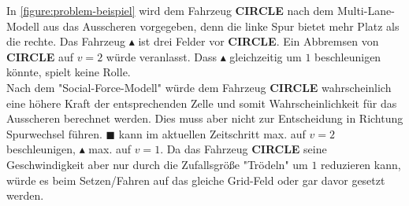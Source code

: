 In \ref{figure:problem-beispiel} wird dem Fahrzeug \textbf{CIRCLE} nach dem Multi-Lane-Modell aus \cite{multi-lane} das Ausscheren vorgegeben, denn die linke Spur bietet mehr Platz als die rechte. 
Das Fahrzeug $\blacktriangle$ ist drei Felder vor \textbf{CIRCLE}.
Ein Abbremsen von \textbf{CIRCLE} auf $v=2$ würde veranlasst.
Dass $\blacktriangle$ gleichzeitig um $1$ beschleunigen könnte, spielt keine Rolle. \\
Nach dem "Social-Force-Modell" würde dem Fahrzeug \textbf{CIRCLE} wahrscheinlich eine höhere Kraft der entsprechenden Zelle und somit Wahrscheinlichkeit für das Ausscheren berechnet werden.
Dies muss aber nicht zur Entscheidung in Richtung Spurwechsel führen.
$\blacksquare$ kann im aktuellen Zeitschritt max. auf $v=2$ beschleunigen, $\blacktriangle$ max. auf $v=1$.
Da das Fahrzeug \textbf{CIRCLE} seine Geschwindigkeit aber nur durch die Zufallsgröße "Trödeln" um $1$ reduzieren kann, würde es beim Setzen/Fahren auf das gleiche Grid-Feld oder gar davor gesetzt werden.